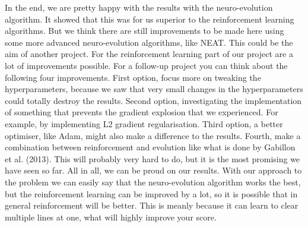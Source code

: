 \documentclass{report}
\begin{document}
In the end, we are pretty happy with the results with the neuro-evolution algorithm. It showed that this was for us superior to the reinforcement learning algorithms. But we think there are still improvements to be made here using some more advanced neuro-evolution algorithms, like NEAT. This could be the aim of another project. For the reinforcement learning part of our project are a lot of improvements possible. For a follow-up project you can think about the following four improvements. First option, focus more on tweaking the hyperparameters, because we saw that very small changes in the hyperparameters could totally destroy the results. Second option, investigating the implementation of something that prevents the gradient explosion that we experienced. For example, by implementing L2 gradient regularisation. Third option, a better optimiser, like Adam, might also make a difference to the results. Fourth, make a combination between reinforcement and evolution like what is done by Gabillon et al. (2013). This will probably very hard to do, but it is the most promising we have seen so far.
All in all, we can be proud on our results. With our approach to the problem we can easily say that the neuro-evolution algorithm works the best, but the reinforcement learning can be improved by a lot, so it is possible that in general reinforcement will be better. This is meanly because it can learn to clear multiple lines at one, what will highly improve your score.


\printbibliography[heading=bibintoc,title={References}]
\end{document}
